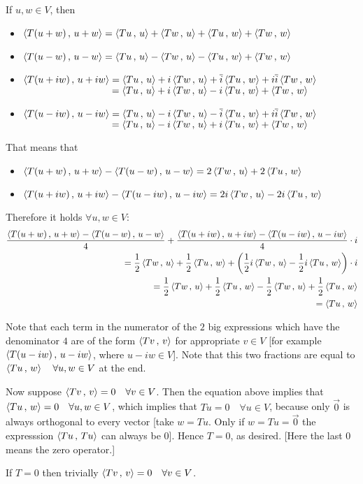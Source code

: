 \begin{prf}
   If $u,w \in V$, then
  \begin{itemize}
    \item $\ip{T(u+w)}{u+w} = \ip{Tu}{u} + \ip{Tw}{u} + \ip{Tu}{w} + \ip{Tw}{w}$
    \item $\ip{T(u-w)}{u-w} = \ip{Tu}{u} - \ip{Tw}{u} - \ip{Tu}{w} + \ip{Tw}{w}$
    \item $\ip{T(u+iw)}{u+iw} = \ip{Tu}{u} + i\ip{Tw}{u} + \overline i \ip{Tu}{w} + i \overline i \ip{Tw}{w}$ \\
    $\phantom{\ip{T(u+iw)}{u+iw} } = \ip{Tu}{u} + i \ip{Tw}{u} - i\ip{Tu}{w} + \ip{Tw}{w}$
    \item $\ip{T(u-iw)}{u-iw} = \ip{Tu}{u} - i\ip{Tw}{u} - \overline i \ip{Tu}{w} + i \overline i \ip{Tw}{w}$ \\
    $\phantom{\ip{T(u+iw)}{u+iw} } = \ip{Tu}{u} - i \ip{Tw}{u} + i\ip{Tu}{w} + \ip{Tw}{w}$
  \end{itemize}

  That means that
  \begin{itemize}
    \item $\ip{T(u+w)}{u+w} - \ip{T(u-w)}{u-w} = 2 \ip{Tw}{u} + 2 \ip{Tu}{w}$
    \item $\ip{T(u+iw)}{u+iw} - \ip{T(u-iw)}{u-iw} = 2i \ip{Tw}{u} - 2i\ip{Tu}{w}$
  \end{itemize}

  Therefore it holds $\forall u,w \in V$:
  \setlength{\abovedisplayskip}{0.6em}
  \[
  \begin{aligned}
      \frac{\ip{T(u+w)}{u+w} - \ip{T(u-w)}{u-w}}{4}
    +
    \frac{\ip{T(u+iw)}{u+iw} - \ip{T(u-iw)}{u-iw}}{4} \cdot i \\
    = \frac{1}{2} \ip{Tw}{u} + \frac{1}{2} \ip{Tu}{w} + \left(\frac{1}{2}i \ip{Tw}{u} - \frac{1}{2}i\ip{Tu}{w} \right)\cdot i \\
    = \frac{1}{2} \ip{Tw}{u} + \frac{1}{2} \ip{Tu}{w} - \frac{1}{2} \ip{Tw}{u} + \frac{1}{2}\ip{Tu}{w} \\
    = \ip{Tu}{w}
  \end{aligned}
  \]
  \setlength{\abovedisplayskip}{0em} %

  Note that each term in the numerator of the $2$ big expressions which have the denominator $4$ are of the form $\ip{Tv}{v}$ for appropriate $v \in V$ [for example $\ip{T(u-iw)}{u-iw}$, where $u-iw \in V$]. Note that this two fractions are equal to $\ip{Tu}{w} \quad \forall u,w \in V$ at the end.

  Now suppose $\ip{Tv}{v} = 0 \quad \forall v \in V$. Then the equation above implies that $\ip{Tu}{w} = 0 \quad \forall u, w \in V$, which implies that $Tu=0 \quad \forall u \in V$, because only $\vec 0$ is always orthogonal to every vector [take $w=Tu$. Only if $w=Tu=\vec 0$ the expresssion $\ip{Tu}{Tu}$ can always  be $0$]. Hence $T=0$, as desired. [Here the last $0$ means the zero operator.]

   If $T = 0$ then trivially $\ip{Tv}{v}=0 \quad \forall v \in V$.
\end{prf}


